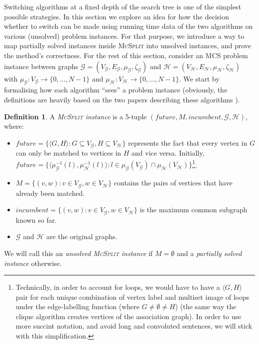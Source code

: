 \documentclass{l4proj}
\theoremstyle{definition}
\newtheorem{definition}{Definition}[chapter]
\theoremstyle{remark}
\begin{document}
Switching algorithms at a fixed depth of the search tree is one of the simplest
possible strategies. In this section we explore an idea for how the decision
whether to switch can be made using running time data of the two algorithms on
various (unsolved) problem instances. For that purpose, we introduce a way to
map partially solved instances inside \textsc{McSplit} into unsolved instances,
and prove the method's correctness. For the rest of this section, consider an
MCS problem instance between graphs $\mathcal{G} = (V_{\mathcal{G}},
E_{\mathcal{G}}, \mu_{\mathcal{G}}, \zeta_{\mathcal{G}})$ and $\mathcal{H} =
(V_{\mathcal{H}}, E_{\mathcal{H}}, \mu_{\mathcal{H}}, \zeta_{\mathcal{H}})$ with
$\mu_{\mathcal{G}} \colon V_{\mathcal{G}} \to \{ 0, \dots, N - 1 \}$ and
$\mu_{\mathcal{H}} \colon V_{\mathcal{H}} \to \{ 0, \dots, N - 1\}$. We
start by formalising how each algorithm ``sees'' a problem instance (obviously,
the definitions are heavily based on the two papers describing these algorithms
\cite{DBLP:conf/cp/McCreeshNPS16, DBLP:conf/ijcai/McCreeshPT17}).

\begin{definition} \label{def:mcsplit_instance}
  A \emph{\textsc{McSplit} instance} is a 5-tuple
  $(\textit{future}, M, \textit{incumbent}, \mathcal{G},
  \mathcal{H})$, where:
  \begin{itemize}
  \item $\textit{future} = \{ \langle G, H \rangle : G \subseteq
    V_{\mathcal{G}}, H \subseteq V_{\mathcal{H}} \}$ represents the fact that
    every vertex in $G$ can only be matched to vertices in $H$ and vice versa.
    Initially, $\textit{future} = \{ \langle \mu_{\mathcal{G}}^{-1}(l),
    \mu_{\mathcal{H}}^{-1}(l) \rangle : l \in \mu_{\mathcal{G}}(V_{\mathcal{G}})
    \cap \mu_{\mathcal{H}}(V_{\mathcal{H}}) \}$\footnote{Technically, in order
      to account for loops, we would have to have a $\langle G, H \rangle$ pair
      for each unique combination of vertex label and multiset image of loops
      under the edge-labelling function (where $G \ne \emptyset \ne H$) (the
      same way the clique algorithm creates vertices of the association graph).
      In order to use more succint notation, and avoid long and convoluted
      sentences, we will stick with this simplification.}.
  \item $M = \{ (v, w) : v \in V_{\mathcal{G}}, w \in V_{\mathcal{H}} \}$
    contains the pairs of vertices that have already been matched.
  \item $\textit{incumbent} = \{ (v, w) : v \in V_{\mathcal{G}}, w \in
    V_{\mathcal{H}} \}$ is the maximum common subgraph known so far.
  \item $\mathcal{G}$ and $\mathcal{H}$ are the original graphs.
  \end{itemize}
  We will call this an \emph{unsolved \textsc{McSplit} instance} if $M =
  \emptyset$ and a \emph{partially solved instance} otherwise.
\end{definition}
\end{document}
